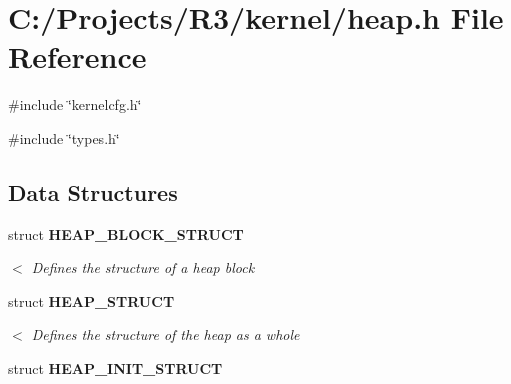 \section{C:/Projects/R3/kernel/heap.h File Reference}
\label{heap_8h}
{\ttfamily \#include \char`\"{}kernelcfg.h\char`\"{}}\par
{\ttfamily \#include \char`\"{}types.h\char`\"{}}\par
\subsection*{Data Structures}
\begin{DoxyCompactItemize}
\item 
struct {\bf HEAP\_\-BLOCK\_\-STRUCT}
\begin{DoxyCompactList}\small\item\em $<$ Defines the structure of a heap block \item\end{DoxyCompactList}\item 
struct {\bf HEAP\_\-STRUCT}
\begin{DoxyCompactList}\small\item\em $<$ Defines the structure of the heap as a whole \item\end{DoxyCompactList}\item 
struct {\bf HEAP\_\-INIT\_\-STRUCT}
\end{DoxyCompactItemize}
